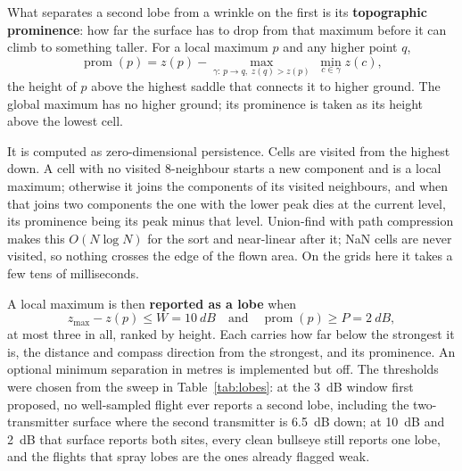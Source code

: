 \documentclass[11pt,a4paper]{article}
\begin{document}
What separates a second lobe from a wrinkle on the first is its \textbf{topographic
prominence}: how far the surface has to drop from that maximum before it can climb to
something taller. For a local maximum $p$ and any higher point $q$,
\begin{equation}
\operatorname{prom}(p) = z(p) - \max_{\gamma:\,p\to q,\; z(q)>z(p)}\;\min_{c\in\gamma} z(c),
\end{equation}
the height of $p$ above the highest saddle that connects it to higher ground. The global
maximum has no higher ground; its prominence is taken as its height above the lowest cell.

\begin{center}
\end{center}

It is computed as zero-dimensional persistence. Cells are visited from the highest down. A
cell with no visited 8-neighbour starts a new component and is a local maximum; otherwise it
joins the components of its visited neighbours, and when that joins two components the one
with the lower peak dies at the current level, its prominence being its peak minus that
level. Union-find with path compression makes this $O(N\log N)$ for the sort and near-linear
after it; NaN cells are never visited, so nothing crosses the edge of the flown area. On the
grids here it takes a few tens of milliseconds.

A local maximum is then \textbf{reported as a lobe} when
\begin{equation}
z_{\max} - z(p) \le W = \SI{10}{dB}
\quad\text{and}\quad
\operatorname{prom}(p) \ge P = \SI{2}{dB},
\end{equation}
at most three in all, ranked by height. Each carries how far below the strongest it is, the
distance and compass direction from the strongest, and its prominence. An optional minimum
separation in metres is implemented but off. The thresholds were chosen from the sweep in
Table~\ref{tab:lobes}: at the \SI{3}{dB} window first proposed, no well-sampled flight ever
reports a second lobe, including the two-transmitter surface where the second transmitter is
\SI{6.5}{dB} down; at \SI{10}{dB} and \SI{2}{dB} that surface reports both sites, every clean
bullseye still reports one lobe, and the flights that spray lobes are the ones already
flagged weak.
\end{document}
